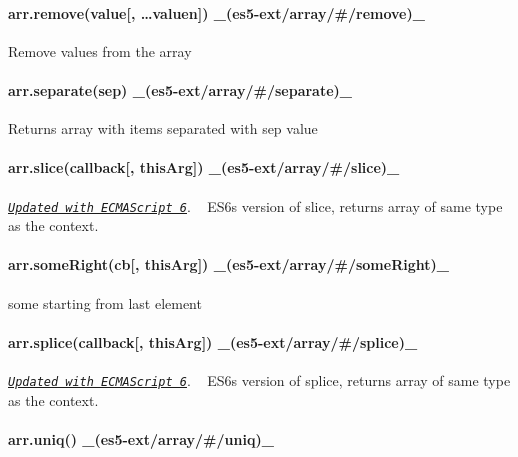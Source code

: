\paragraph*{arr.\+remove(value\mbox{[}, …valuen\mbox{]}) \+\_\+(es5-\/ext/array/\#/remove)\+\_\+}

Remove values from the array

\paragraph*{arr.\+separate(sep) \+\_\+(es5-\/ext/array/\#/separate)\+\_\+}

Returns array with items separated with {\ttfamily sep} value

\paragraph*{arr.\+slice(callback\mbox{[}, this\+Arg\mbox{]}) \+\_\+(es5-\/ext/array/\#/slice)\+\_\+}

\href{http://people.mozilla.org/~jorendorff/es6-draft.html#sec-array.slice}{\tt {\itshape Updated with E\+C\+M\+A\+Script 6}}. ~\newline
E\+S6\textquotesingle{}s version of {\ttfamily slice}, returns array of same type as the context.

\paragraph*{arr.\+some\+Right(cb\mbox{[}, this\+Arg\mbox{]}) \+\_\+(es5-\/ext/array/\#/some\+Right)\+\_\+}

{\ttfamily some} starting from last element

\paragraph*{arr.\+splice(callback\mbox{[}, this\+Arg\mbox{]}) \+\_\+(es5-\/ext/array/\#/splice)\+\_\+}

\href{http://people.mozilla.org/~jorendorff/es6-draft.html#sec-array.splice}{\tt {\itshape Updated with E\+C\+M\+A\+Script 6}}. ~\newline
E\+S6\textquotesingle{}s version of {\ttfamily splice}, returns array of same type as the context.

\paragraph*{arr.\+uniq() \+\_\+(es5-\/ext/array/\#/uniq)\+\_\+}

